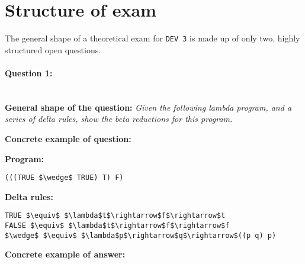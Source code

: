 \section*{Structure of exam \modulecode}

The general shape of a theoretical exam for \texttt{DEV 3} is made up of only two, highly structured open questions.

\paragraph{Question 1: } \ \\

\textbf{General shape of the question:} \textit{Given the following lambda program, and a series of delta rules, show the beta reductions for this program.}

\textbf{Concrete example of question:}

\textbf{Program:}
\lstset{numbers=left,basicstyle=\ttfamily\small}\lstset{language=[Sharp]C}\begin{lstlisting}
(((TRUE $\wedge$ TRUE) T) F)
\end{lstlisting}

\textbf{Delta rules:}
\lstset{numbers=left,basicstyle=\ttfamily\small}\lstset{language=[Sharp]C}\begin{lstlisting}
TRUE $\equiv$ $\lambda$t$\rightarrow$f$\rightarrow$t
FALSE $\equiv$ $\lambda$t$\rightarrow$f$\rightarrow$f
$\wedge$ $\equiv$ $\lambda$p$\rightarrow$q$\rightarrow$((p q) p)
\end{lstlisting}

\textbf{Concrete example of answer:}

